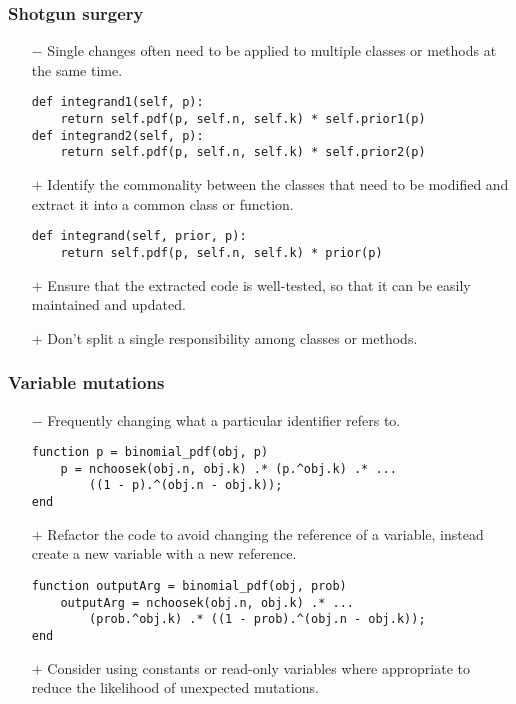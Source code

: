 \documentclass{beamer}
\begin{document}
\begin{frame}[fragile]
\frametitle{Shotgun surgery}
\begin{itemize}
\item[$-$] Single changes often need to be applied to multiple classes or methods at the same time.
\begin{lstlisting}[style=python]
def integrand1(self, p):
    return self.pdf(p, self.n, self.k) * self.prior1(p)
def integrand2(self, p):
    return self.pdf(p, self.n, self.k) * self.prior2(p)
\end{lstlisting}
\item[$+$] Identify the commonality between the classes that need to be modified and extract it into a common class or function.
\begin{lstlisting}[style=python]
def integrand(self, prior, p):
    return self.pdf(p, self.n, self.k) * prior(p)
\end{lstlisting}
\item[$+$] Ensure that the extracted code is well-tested, so that it can be easily maintained and updated.
\item[$+$] Don't split a single responsibility among classes or methods.
\end{itemize}


\end{frame}

\begin{frame}[fragile]
\frametitle{Variable mutations}
\begin{itemize}
\item[$-$] Frequently changing what a particular identifier refers to.
\begin{lstlisting}[style=MATLAB]
function p = binomial_pdf(obj, p)
    p = nchoosek(obj.n, obj.k) .* (p.^obj.k) .* ...
        ((1 - p).^(obj.n - obj.k));
end
\end{lstlisting}
\item[$+$] Refactor the code to avoid changing the reference of a variable, instead create a new variable with a new reference.
\begin{lstlisting}[style=MATLAB]
function outputArg = binomial_pdf(obj, prob)
    outputArg = nchoosek(obj.n, obj.k) .* ...
        (prob.^obj.k) .* ((1 - prob).^(obj.n - obj.k));
end
\end{lstlisting}
\item[$+$] Consider using constants or read-only variables where appropriate to reduce the likelihood of unexpected mutations.
\end{itemize}

\end{frame}
\end{document}
